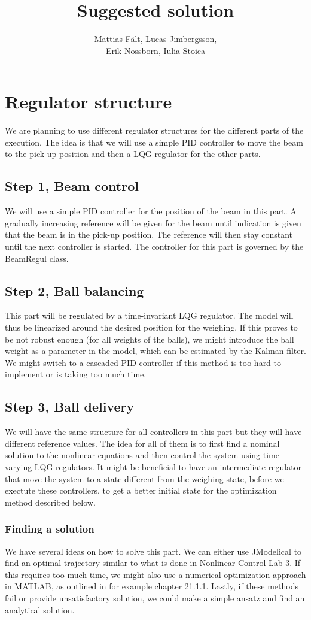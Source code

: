 \documentclass{article}
\title{Suggested solution}
\author{Mattias Fält, Lucas Jimbergsson,\\Erik Nossborn, Iulia Stoica}
\begin{document}
\maketitle

\section{Regulator structure}\label{regstruc}
We are planning to use different regulator structures for the different parts of the execution. The idea is that we will use a simple PID controller to move the beam to the pick-up position and then a LQG regulator for the other parts.
\subsection{Step 1, Beam control}
We will use a simple PID controller for the position of the beam in this part. A gradually increasing reference will be given for the beam until indication is given that the beam is in the pick-up position. The reference will then stay constant until the next controller is started. The controller for this part is governed by the BeamRegul class.
\subsection{Step 2, Ball balancing}\label{step2}
This part will be regulated by a time-invariant LQG regulator. The model will thus be linearized around the desired position for the weighing. If this proves to be not robust enough (for all weights of the balls), we might introduce the ball weight as a parameter in the model, which can be estimated by the Kalman-filter. We might switch to a cascaded PID controller if this method is too hard to implement or is taking too much time.
\subsection{Step 3, Ball delivery}
We will have the same structure for all controllers in this part but they will have different reference values. The idea for all of them is to first find a nominal solution to the nonlinear equations and then control the system using time-varying LQG regulators. It might be beneficial to have an intermediate regulator that move the system to a state different from the weighing state, before we exectute these controllers, to get a better initial state for the optimization method described below.
\subsubsection{Finding a solution}
We have several ideas on how to solve this part. We can either use JModelical to find an optimal trajectory similar to what is done in Nonlinear Control Lab 3. If this requires too much time, we might also use a numerical optimization approach in MATLAB, as outlined in for example \cite{NR} chapter 21.1.1. Lastly, if these methods fail or provide unsatisfactory solution, we could make a simple ansatz and find an analytical solution.
\end{document}
